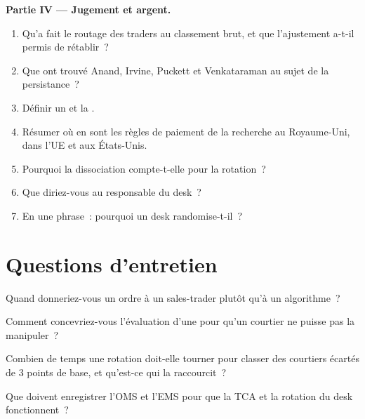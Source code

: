 \begin{problem}
\medskip\noindent\textbf{Partie IV --- Jugement et argent.}
\begin{enumerate}[resume]
\item Qu'a fait le routage des traders au classement brut, et que l'ajustement a-t-il permis de rétablir~?
\item Que ont trouvé Anand, Irvine, Puckett et Venkataraman au sujet de la persistance~?
\item Définir un  et la .
\item Résumer où en sont les règles de paiement de la recherche au Royaume-Uni, dans l'UE et aux États-Unis.
\item Pourquoi la dissociation compte-t-elle pour la rotation~?
\item Que diriez-vous au responsable du desk~?
\item En une phrase~: pourquoi un desk randomise-t-il~?
\end{enumerate}
\end{problem}

\section{Questions d'entretien}

\begin{interviewq}\label{iq:mx:the-buy-side-trading-desk-and-its-brokers:1}
Quand donneriez-vous un ordre à un sales-trader plutôt qu'à un algorithme~?
\end{interviewq}

\begin{interviewq}\label{iq:mx:the-buy-side-trading-desk-and-its-brokers:2}
Comment concevriez-vous l'évaluation d'une  pour qu'un courtier ne puisse pas la manipuler~?
\end{interviewq}

\begin{interviewq}\label{iq:mx:the-buy-side-trading-desk-and-its-brokers:3}
Combien de temps une rotation doit-elle tourner pour classer des courtiers écartés de 3 points de base, et qu'est-ce qui la raccourcit~?
\end{interviewq}

\begin{interviewq}\label{iq:mx:the-buy-side-trading-desk-and-its-brokers:4}
Que doivent enregistrer l'OMS et l'EMS pour que la TCA et la rotation du desk fonctionnent~?
\end{interviewq}

